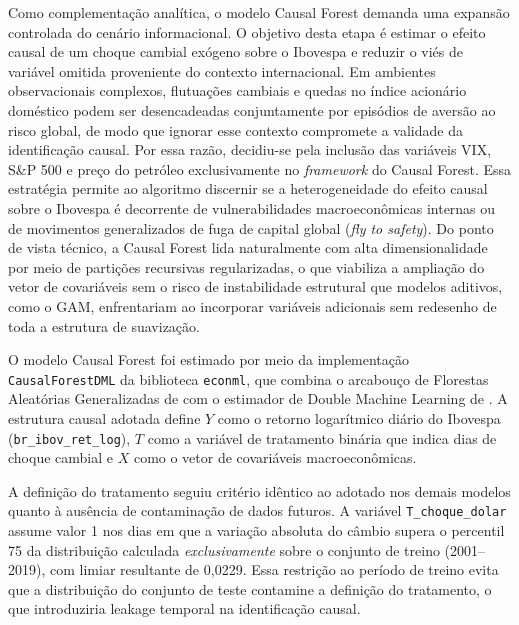 \documentclass[	12pt, Times, openright, oneside, a4paper, english, brazil]{abntex2}
\begin{document}
Como complementação analítica, o modelo Causal Forest demanda uma expansão controlada do cenário informacional. O objetivo desta etapa é estimar o efeito causal de um choque cambial exógeno sobre o Ibovespa e reduzir o viés de variável omitida proveniente do contexto internacional. Em ambientes observacionais complexos, flutuações cambiais e quedas no índice acionário doméstico podem ser desencadeadas conjuntamente por episódios de aversão ao risco global, de modo que ignorar esse contexto compromete a validade da identificação causal. Por essa razão, decidiu-se pela inclusão das variáveis VIX, S\&P 500 e preço do petróleo exclusivamente no \textit{framework} do Causal Forest. Essa estratégia permite ao algoritmo discernir se a heterogeneidade do efeito causal sobre o Ibovespa é decorrente de vulnerabilidades macroeconômicas internas ou de movimentos generalizados de fuga de capital global (\textit{fly to safety}). Do ponto de vista técnico, a Causal Forest lida naturalmente com alta dimensionalidade por meio de partições recursivas regularizadas, o que viabiliza a ampliação do vetor de covariáveis sem o risco de instabilidade estrutural que modelos aditivos, como o GAM, enfrentariam ao incorporar variáveis adicionais sem redesenho de toda a estrutura de suavização.

O modelo Causal Forest foi estimado por meio da implementação \texttt{CausalForestDML} da biblioteca \texttt{econml}, que combina o arcabouço de Florestas Aleatórias Generalizadas de  com o estimador de Double Machine Learning de . A estrutura causal adotada define $Y$ como o retorno logarítmico diário do Ibovespa (\texttt{br\_ibov\_ret\_log}), $T$ como a variável de tratamento binária que indica dias de choque cambial e $X$ como o vetor de covariáveis macroeconômicas.

A definição do tratamento seguiu critério idêntico ao adotado nos demais modelos quanto à ausência de contaminação de dados futuros. A variável \texttt{T\_choque\_dolar} assume valor 1 nos dias em que a variação absoluta do câmbio supera o percentil 75 da distribuição calculada \textit{exclusivamente} sobre o conjunto de treino (2001--2019), com limiar resultante de 0,0229. Essa restrição ao período de treino evita que a distribuição do conjunto de teste contamine a definição do tratamento, o que introduziria leakage temporal na identificação causal.
\end{document}
